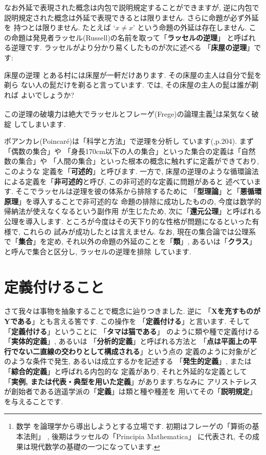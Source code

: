 \documentclass[b5j,8pt,twocolumn]{ltjsarticle}
\begin{document}
なお外延で表現された概念は内包で説明規定することができますが, 逆に内包で
説明規定された概念は外延で表現できるとは限りません. さらに命題が必ず外延を
持つとは限りません. たとえば `$x \neq x$' という命題の外延は存在しません.
 この命題は発見者ラッセル(Russell)の名前を取って「\textbf{ラッセルの逆理}」
と呼ばれる逆理です. ラッセルがより分かり易くしたものが次に述べる
「\textbf{床屋の逆理}」です:

\begin{itembox}[c]{{床屋の逆理}}
\quad とある村には床屋が一軒だけあります. その床屋の主人は自分で髭を剃ら
ない人の髭だけを剃ると言っています. では, その床屋の主人の髭は誰が剃れば
よいでしょうか?
\end{itembox}


この逆理の破壊力は絶大でラッセルとフレーゲ(Frege)の論理主義\footnote{数学
を論理学から導出しようとする立場です. 初期はフレーゲの「算術の基本法則」
\cite{フレーゲ}, 後期はラッセルの「Principia Mathematica」\cite{Russell}
に代表され, その成果は現代数学の基礎の一つになっています.}は呆気なく破綻
してしまいます.
\newline


ポアンカレ(Poincar\'e)は「科学と方法」\cite{ポアンカレ}で逆理を分析し
ています(\cite{ポアンカレ},p.204). まず「偶数の集合」や
「身長170cm以下の人の集合」といった集合の定義は「自然数の集合」や
「人間の集合」といった根本の概念に触れずに定義ができており, このような
定義を「\textbf{可述的}」と呼びます. 一方で, 床屋の逆理のような循環論法
による定義を「\textbf{非可述的}と呼び, この非可述的な定義に問題があると
述べています. そこでラッセルは逆理を彼の体系から排除するために
「\textbf{型理論}」と「\textbf{悪循環原理}」を導入することで非可述的な
命題の排除に成功したものの, 今度は数学的帰納法が使えなくなるという副作用
が生じたため,  次に「\textbf{還元公理}」と呼ばれる公理を導入します. 
 ところが今度はその天下り的な性格が問題になるといった有様で, これらの
試みが成功したとは言えません\cite{Russell}. なお, 現在の集合論では公理系
で「\textbf{集合}」を定め, それ以外の命題の外延のことを「\textbf{類}」,
 あるいは「\textbf{クラス}」と呼んで集合と区分し, ラッセルの逆理を排除
しています.

\section{定義付けること}

さて我々は事物を抽象することで概念に辿りつきました. 逆に
「\textbf{Xを充すものがYである}」とも言える筈です. この操作を
「\textbf{定義付ける}」と言います. そして「\textbf{定義付ける}」ということに
「\textbf{タマは猫である}」 のように類や種で定義付ける「\textbf{実体的定義}」,
 あるいは 「\textbf{分析的定義}」と呼ばれる方法と
「\textbf{点は平面上の平行でない二直線の交わりとして構成される}」という点の
定義のように対象がどのような条件で発生, あるいは成立するかを記述する
「\textbf{発生的定義}」, または 「\textbf{綜合的定義}」と呼ばれる内包的な
定義があり, それと外延的な定義として
「\textbf{実例, または代表・典型を用いた定義}」があります.ちなみに
アリストテレスが創始者である逍遥学派の「\textbf{定義}」は類と種や種差を
用いてその「\textbf{説明規定}」を与えることです.
\end{document}
